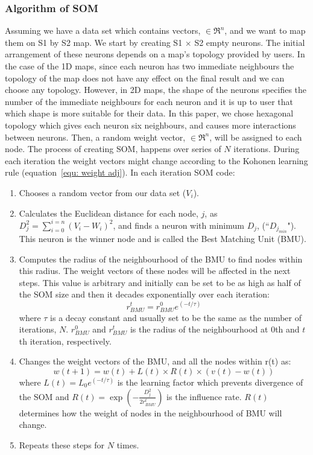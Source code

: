  \subsubsection{Algorithm of SOM} 
 \label{sec: algorithm}
     Assuming we have a data set which contains vectors,  $\in \Re^n$, and we want to map them on S1 by S2 map. 
     We start by creating S1 $\times$ S2 empty neurons. 
     The initial arrangement of these neurons depends on a map's topology provided by users.
     In the case of the 1D maps, since each neuron has two immediate neighbours the topology of the map does not have any effect on the final result and we can choose any topology.
     However, in 2D maps, the shape of the neurons specifies the number of the immediate neighbours for each neuron and it is up to user that which shape is more suitable for their data.
     In this paper, we chose hexagonal topology which gives each neuron six neighbours, and causes more interactions between neurons.
     Then, a random weight vector,  $\in \Re^n$, will be assigned to each node.
     The process of creating SOM, happens over series of $N$ iterations. 
     During each iteration the weight vectors might change according to the Kohonen learning rule (equation~\ref{equ: weight adj}). 
      In each iteration SOM code:
     \begin{enumerate}
        \item Chooses a random vector from our data set ($V_i$).
        \item Calculates the Euclidean distance for each node, $j$, as  $D_j^2= \sum_{i=0}^{i=n} (V_i - W_i)^2$, and finds a neuron with minimum $D_j$, (``$D_{j_{min}}$"). This neuron is the winner node and is called the Best Matching Unit (BMU). 
        \item  Computes the radius of the neighbourhood of the BMU to find nodes within this radius. The weight vectors of these nodes will be affected in the next steps. This value is arbitrary and initially can be set to be as high as half of the SOM size and then it decades exponentially over each iteration:
        \begin{equation}
            r^t_{BMU} = r^0_{BMU}e^{(-t/\tau)}
        \end{equation}
        where $\tau$ is a decay constant and usually set to be the same as the number of iterations, $N$. $r^0_{BMU}$ and $r^t_{BMU}$ is the radius of the neighbourhood at 0th and $t$th iteration, respectively. 
        \item Changes the weight vectors of the BMU, and all the nodes within r(t) as: %
        \begin{equation}
            \label{equ: weight adj}
            w(t+1)=w(t)+L(t) \times R(t) \times(v(t)-w(t))
        \end{equation}
        where $L(t) = L_0 e^{(-t/\tau)}$ is the learning factor which prevents divergence of the SOM and $R(t)=\exp(-\frac{D_j^2}{2r^t_{BMU}})$ is the influence rate. $R(t)$ determines how the weight of nodes in the neighbourhood of BMU will change.
        \item  Repeats these steps for $N$ times.
     \end{enumerate}
     
